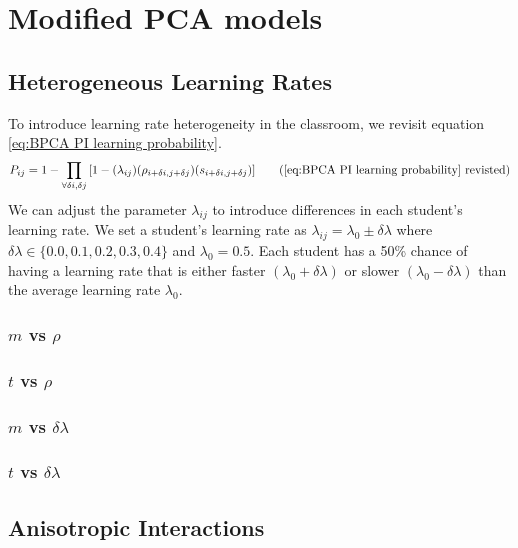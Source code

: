 \chapter{Modified PCA models}

\section{Heterogeneous Learning Rates}
To introduce learning rate heterogeneity in the classroom, we revisit equation \ref{eq:BPCA PI learning probability}. 
\begin{equation*}
    P_{ij} = 1 - \prod_{\forall \delta i, \delta j}{\lbrack1-(\lambda_{ij})(\rho_{i+\delta i, j+\delta j})(s_{i+\delta i, j+\delta j})}\rbrack
    \tag{\ref{eq:BPCA PI learning probability} revisted}
\end{equation*}
We can adjust the parameter $\lambda_{ij}$ to introduce differences in each student's learning rate. We set a student's learning rate as $\lambda_{ij} = \lambda_0 \pm \delta\lambda$ where $\delta\lambda \in \lbrace 0.0,0.1, 0.2, 0.3, 0.4\rbrace$ and $\lambda_0 = 0.5$. Each student has a 50\% chance of having a learning rate that is either faster $(\lambda_0 + \delta\lambda)$ or slower $(\lambda_0 - \delta\lambda)$ than the average learning rate $\lambda_0$. 

\subsection{$m$ vs $\rho$}\label{subsec:BPCAIH m vs rho}
\subsection{$t$ vs $\rho$}\label{subsec:BPCAIH t vs rho}
\subsection{$m$ vs $\delta\lambda$}\label{subsec:BPCAIH m vs dl}
\subsection{$t$ vs $\delta\lambda$}\label{subsec:BPCAIH t vs dl}

\section{Anisotropic Interactions}
